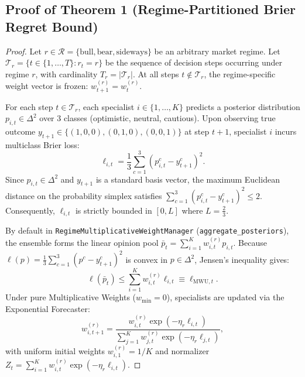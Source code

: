 \documentclass[10pt,a4paper,twocolumn]{article}
\begin{document}
\subsection{Proof of Theorem 1 (Regime-Partitioned Brier Regret Bound)}
\begin{proof}
Let $r \in \mathcal{R} = \{\text{bull}, \text{bear}, \text{sideways}\}$ be an arbitrary market regime. Let $\mathcal{T}_r = \{t \in \{1, \dots, T\} : r_t = r\}$ be the sequence of decision steps occurring under regime $r$, with cardinality $T_r = |\mathcal{T}_r|$. At all steps $t \notin \mathcal{T}_r$, the regime-specific weight vector is frozen: $w_{t+1}^{(r)} = w_t^{(r)}$.

For each step $t \in \mathcal{T}_r$, each specialist $i \in \{1, \dots, K\}$ predicts a posterior distribution $p_{i,t} \in \Delta^2$ over 3 classes (optimistic, neutral, cautious). Upon observing true outcome $y_{t+1} \in \{(1,0,0),(0,1,0),(0,0,1)\}$ at step $t+1$, specialist $i$ incurs multiclass Brier loss:
\begin{equation}
  \ell_{i,t} = \frac{1}{3}\sum_{c=1}^3 \left(p_{i,t}^c - y_{t+1}^c\right)^2.
\end{equation}
Since $p_{i,t} \in \Delta^2$ and $y_{t+1}$ is a standard basis vector, the maximum Euclidean distance on the probability simplex satisfies $\sum_{c=1}^3 (p_{i,t}^c - y_{t+1}^c)^2 \le 2$. Consequently, $\ell_{i,t}$ is strictly bounded in $[0, L]$ where $L = \frac{2}{3}$.

By default in \texttt{RegimeMultiplicativeWeightManager} (\texttt{aggregate\_posteriors}), the ensemble forms the linear opinion pool $\bar{p}_t = \sum_{i=1}^K w_{i,t}^{(r)} p_{i,t}$. Because $\ell(p) = \frac{1}{3}\sum_{c=1}^3 (p^c - y_{t+1}^c)^2$ is convex in $p \in \Delta^2$, Jensen's inequality gives:
\begin{equation}
  \ell(\bar{p}_t) \le \sum_{i=1}^K w_{i,t}^{(r)} \ell_{i,t} \equiv \ell_{\text{MWU}, t}.
\end{equation}
Under pure Multiplicative Weights ($w_{\min} = 0$), specialists are updated via the Exponential Forecaster:
\begin{equation}
  w_{i,t+1}^{(r)} = \frac{w_{i,t}^{(r)} \exp(-\eta_r \ell_{i,t})}{\sum_{j=1}^K w_{j,t}^{(r)} \exp(-\eta_r \ell_{j,t})},
\end{equation}
with uniform initial weights $w_{i,1}^{(r)} = 1/K$ and normalizer $Z_t = \sum_{i=1}^K w_{i,t}^{(r)} \exp(-\eta_r \ell_{i,t})$.


\end{proof}
\end{document}
